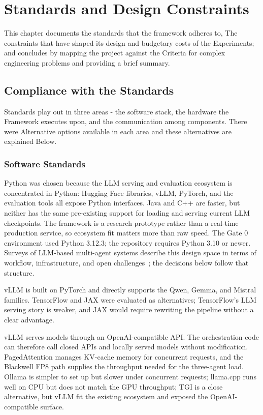 \chapter{Standards and Design Constraints}
This chapter documents the standards that the framework adheres to,
The constraints that have shaped its design and budgetary costs of the
Experiments; and concludes by mapping the project against the
Criteria for complex engineering problems and providing a brief summary.

\section{Compliance with the Standards}
Standards play out in three areas - the software stack, the hardware the
Framework executes upon, and the communication among components. There were
Alternative options available in each area and these alternatives are explained
Below.

\subsection{Software Standards}

Python was chosen because the LLM serving and evaluation ecosystem is concentrated in Python: Hugging Face libraries, vLLM, PyTorch, and the evaluation tools all expose Python interfaces. Java and C++ are faster, but neither has the same pre-existing support for loading and serving current LLM checkpoints. The framework is a research prototype rather than a real-time production service, so ecosystem fit matters more than raw speed. The Gate 0 environment used Python 3.12.3; the repository requires Python 3.10 or newer. Surveys of LLM-based multi-agent systems describe this design space in terms of workflow, infrastructure, and open challenges~\cite{li2024survey}; the decisions below follow that structure.

vLLM is built on PyTorch and directly supports the Qwen, Gemma, and Mistral families. TensorFlow and JAX were evaluated as alternatives; TensorFlow's LLM serving story is weaker, and JAX would require rewriting the pipeline without a clear advantage.

vLLM serves models through an OpenAI-compatible API. The orchestration code can therefore call closed APIs and locally served models without modification. PagedAttention manages KV-cache memory for concurrent requests, and the Blackwell FP8 path supplies the throughput needed for the three-agent load. Ollama is simpler to set up but slower under concurrent requests; llama.cpp runs well on CPU but does not match the GPU throughput; TGI is a close alternative, but vLLM fit the existing ecosystem and exposed the OpenAI-compatible surface.

